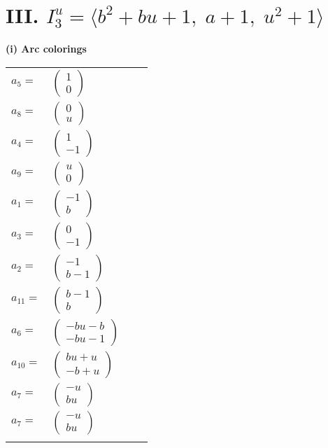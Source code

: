 \documentclass[1p]{elsarticle_modified}
\theoremstyle{definition}
\begin{document}
\centering \section*{III. $I^u_{3}= \langle b^2+b u+1,\;a+1,\;u^2+1 \rangle$}
\flushleft \textbf{(i) Arc colorings}\\
\begin{tabular}{m{7pt} m{180pt} m{7pt} m{180pt} }
\flushright $a_{5}=$&$\begin{pmatrix}1\\0\end{pmatrix}$ \\
\flushright $a_{8}=$&$\begin{pmatrix}0\\u\end{pmatrix}$ \\
\flushright $a_{4}=$&$\begin{pmatrix}1\\-1\end{pmatrix}$ \\
\flushright $a_{9}=$&$\begin{pmatrix}u\\0\end{pmatrix}$ \\
\flushright $a_{1}=$&$\begin{pmatrix}-1\\b\end{pmatrix}$ \\
\flushright $a_{3}=$&$\begin{pmatrix}0\\-1\end{pmatrix}$ \\
\flushright $a_{2}=$&$\begin{pmatrix}-1\\b-1\end{pmatrix}$ \\
\flushright $a_{11}=$&$\begin{pmatrix}b-1\\b\end{pmatrix}$ \\
\flushright $a_{6}=$&$\begin{pmatrix}- b u- b\\- b u-1\end{pmatrix}$ \\
\flushright $a_{10}=$&$\begin{pmatrix}b u+u\\- b+u\end{pmatrix}$ \\
\flushright $a_{7}=$&$\begin{pmatrix}- u\\b u\end{pmatrix}$\\ \flushright $a_{7}=$&$\begin{pmatrix}- u\\b u\end{pmatrix}$\\&\end{tabular}
\end{document}
